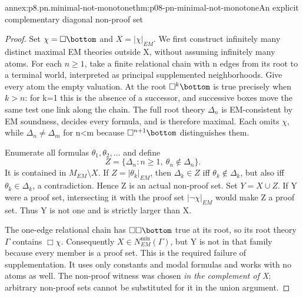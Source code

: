 \begin{annexitem}{annex:p8.pn.minimal-not-monotone}{thm:p08-pn-minimal-not-monotone}{An explicit complementary diagonal non-proof set}
\begin{proof}
Set \(\chi=\Box\bottom\) and \(X=|\chi|_{EM}\).
We first construct infinitely many distinct maximal EM theories
outside X, without assuming infinitely many atoms. For each
\(n\geq1\), take a finite relational chain with n edges from
its root to a terminal world, interpreted as principal supplemented
neighborhoods. Give every atom the empty valuation. At the root
\(\Box^k\bottom\) is true precisely when \(k>n\): for
k=1 this is the absence of a successor, and successive boxes
move the same test one link along the chain. The full root theory
\(\Delta_n\) is EM-consistent by EM soundness, decides every
formula, and is therefore maximal. Each omits \(\chi\), while
\(\Delta_n\ne\Delta_m\) for n<m because
\(\Box^{n+1}\bottom\) distinguishes them.

Enumerate all formulas \(\theta_1,\theta_2,\ldots\) and define
\[
 Z=\{\Delta_n:n\geq1,\ \theta_n\notin\Delta_n\}.
\]
It is contained in \(M_{EM}\setminus X\). If
\(Z=|\theta_k|_{EM}\), then \(\Delta_k\in Z\) iff
\(\theta_k\notin\Delta_k\), but also iff
\(\theta_k\in\Delta_k\), a contradiction. Hence Z is
an actual non-proof set. Set \(Y=X\cup Z\). If Y were a
proof set, intersecting it with the proof set
\(|\neg\chi|_{EM}\) would make Z a proof set. Thus Y is
not one and is strictly larger than X.

The one-edge relational chain has \(\Box\Box\bottom\)
true at its root, so its root theory \(\Gamma\) contains
\(\Box\chi\). Consequently
\(X\in N_{EM}^{\min}(\Gamma)\), but Y is not in that
family because every member is a proof set. This is the required
failure of supplementation. It uses only constants and modal
formulas and works with no atoms as well. The non-proof witness
was chosen \emph{in the complement of X}; arbitrary non-proof
sets cannot be substituted for it in the union argument.
\end{proof}
\end{annexitem}

